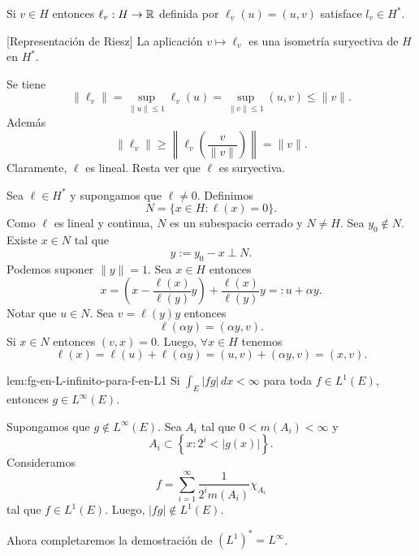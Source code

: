 Si $v \in H$ entonces $\ell_v: H \to \mathbb{R}$ definida por $\ell_v(u)=(u,v)$
satisface $l_v \in H^*$.


\begin{teorema}{}[Representaci\'on de Riesz]
La aplicaci\'on $v \longmapsto \ell_v$ es una isometr\'ia suryectiva de
$H$ en $H^*$.
\end{teorema}

\begin{demo}
Se tiene 
\[
\|\ell_v\|=\sup\limits_{\|u\|\leq 1} \ell_v(u) =
\sup\limits_{\|v\|\leq 1} (u,v)\leq \|v\|.
\]
Adem\'as
\[
\|\ell_v\|\geq \left\|\ell_v\left(\frac{v}{\|v\|}\right) \right\|
=\|v\|.
\]
Claramente, $\ell$ es lineal. Resta ver que $\ell$ es suryectiva. 

Sea $\ell \in H^*$ y supongamos que $\ell \neq 0$. Definimos
\[
N=\{ x \in H: \ell(x)=0  \}.
\]
Como $\ell $ es lineal y continua, $N$ es un subespacio cerrado y $N \neq H$. Sea $y_0 \notin N$. Existe $x \in N$ tal que \[y:=y_0-x \perp N.\]
Podemos suponer $\|y\|=1$. 
Sea $x \in H$ entonces
\[
x=\left( x- \frac{\ell(x)}{\ell(y)} y \right)+\frac{\ell(x)}{\ell(y)} y=:
u+\alpha y.
\]
Notar que $u \in N$. Sea $v=\ell(y) y$ entonces
\[
\ell(\alpha y)=(\alpha y,v).
\]
Si $x \in N$ entonces $(v,x)=0$. Luego, $\forall x \in H$ tenemos
\[
\ell(x)=\ell(u)+\ell(\alpha y)=(u,v)+(\alpha y,v)=(x,v).
\]
\end{demo}

\begin{lema}{lem:fg-en-L-infinito-para-f-en-L1}
Si 
$
\int_E |fg|\,dx <\infty
$
para toda $f \in L^1(E)$, entonces $g \in L^{\infty}(E)$.
\end{lema}

\begin{demo}
Supongamos que $g \notin L^{\infty}(E)$. Sea $A_i$ tal que $0<m(A_i)<\infty$ y 
\[
A_i\subset \left\{x: 2^i< |g(x)|\right\}.
\]
Consideramos  \[f = \sum\limits_{i=1}^{\infty} \frac{1}{2^im(A_i)} \chi_{A_i} \] tal que $f \in L^1(E)$. 
Luego, $|fg| \notin L^1(E)$.
\end{demo}

Ahora completaremos la demostraci\'on de
$(L^1)^*=L^{\infty}$.

